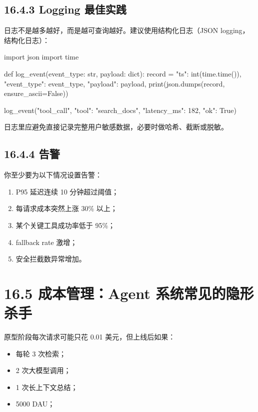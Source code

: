 \subsection{16.4.3 Logging 最佳实践}

日志不是越多越好，而是越可查询越好。建议使用结构化日志（JSON logging，结构化日志）：


\begin{codeblock}
import json
import time

def log_event(event_type: str, payload: dict):
    record = {
        "ts": int(time.time()),
        "event_type": event_type,
        "payload": payload,
    }
    print(json.dumps(record, ensure_ascii=False))

log_event("tool_call", {"tool": "search_docs", "latency_ms": 182, "ok": True})
\end{codeblock}

日志里应避免直接记录完整用户敏感数据，必要时做哈希、截断或脱敏。


\subsection{16.4.4 告警}

你至少要为以下情况设置告警：


\begin{enumerate}[leftmargin=2em]
\item P95 延迟连续 10 分钟超过阈值；
\item 每请求成本突然上涨 30\% 以上；
\item 某个关键工具成功率低于 95\%；
\item fallback rate 激增；
\item 安全拦截数异常增加。
\end{enumerate}

\section{16.5 成本管理：Agent 系统常见的隐形杀手}

原型阶段每次请求可能只花 0.01 美元，但上线后如果：


\begin{itemize}[leftmargin=2em]
\item 每轮 3 次检索；
\item 2 次大模型调用；
\item 1 次长上下文总结；
\item 5000 DAU；
\end{itemize}

